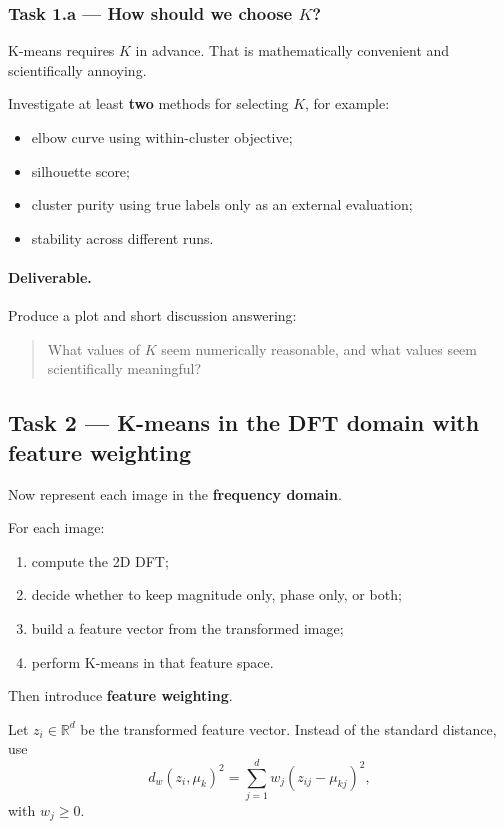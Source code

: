 \documentclass[11pt]{article}
\begin{document}
\subsubsection*{Task 1.a --- How should we choose \(K\)?}

K-means requires \(K\) in advance. That is mathematically convenient and scientifically annoying.

Investigate at least \textbf{two} methods for selecting \(K\), for example:
\begin{itemize}[itemsep=2pt]
    \item elbow curve using within-cluster objective;
    \item silhouette score;
    \item cluster purity using true labels only as an external evaluation;
    \item stability across different runs.
\end{itemize}

\paragraph{Deliverable.}
Produce a plot and short discussion answering:
\begin{quote}
What values of \(K\) seem numerically reasonable, and what values seem scientifically meaningful?
\end{quote}

\subsection*{Task 2 --- K-means in the DFT domain with feature weighting}

Now represent each image in the \textbf{frequency domain}.

For each image:
\begin{enumerate}[itemsep=2pt]
    \item compute the 2D DFT;
    \item decide whether to keep magnitude only, phase only, or both;
    \item build a feature vector from the transformed image;
    \item perform K-means in that feature space.
\end{enumerate}

Then introduce \textbf{feature weighting}.

Let \(z_i \in \mathbb{R}^d\) be the transformed feature vector. Instead of the standard distance, use
\[
d_w(z_i, \mu_k)^2 = \sum_{j=1}^d w_j (z_{ij} - \mu_{kj})^2,
\]
with \(w_j \ge 0\).
\end{document}
